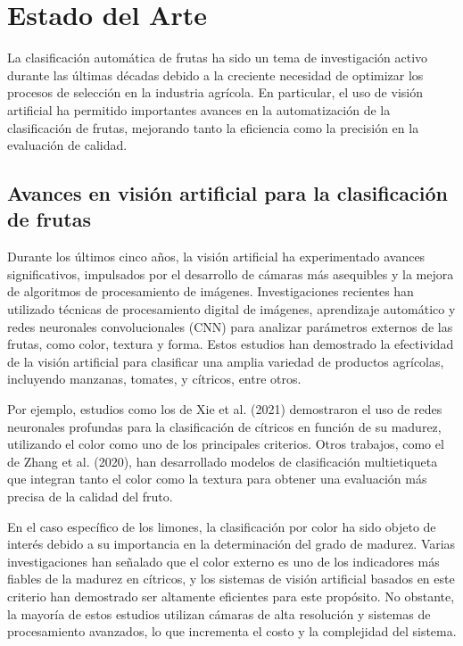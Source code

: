 \section{Estado del Arte}

La clasificación automática de frutas ha sido un tema de investigación activo durante las últimas décadas debido a la creciente necesidad de optimizar los procesos de selección en la industria agrícola. En particular, el uso de visión artificial ha permitido importantes avances en la automatización de la clasificación de frutas, mejorando tanto la eficiencia como la precisión en la evaluación de calidad.

\subsection{Avances en visión artificial para la clasificación de frutas}

Durante los últimos cinco años, la visión artificial ha experimentado avances significativos, impulsados por el desarrollo de cámaras más asequibles y la mejora de algoritmos de procesamiento de imágenes. Investigaciones recientes han utilizado técnicas de procesamiento digital de imágenes, aprendizaje automático y redes neuronales convolucionales (CNN) para analizar parámetros externos de las frutas, como color, textura y forma. Estos estudios han demostrado la efectividad de la visión artificial para clasificar una amplia variedad de productos agrícolas, incluyendo manzanas, tomates, y cítricos, entre otros.

Por ejemplo, estudios como los de Xie et al. (2021) demostraron el uso de redes neuronales profundas para la clasificación de cítricos en función de su madurez, utilizando el color como uno de los principales criterios. Otros trabajos, como el de Zhang et al. (2020), han desarrollado modelos de clasificación multietiqueta que integran tanto el color como la textura para obtener una evaluación más precisa de la calidad del fruto.

En el caso específico de los limones, la clasificación por color ha sido objeto de interés debido a su importancia en la determinación del grado de madurez. Varias investigaciones han señalado que el color externo es uno de los indicadores más fiables de la madurez en cítricos, y los sistemas de visión artificial basados en este criterio han demostrado ser altamente eficientes para este propósito. No obstante, la mayoría de estos estudios utilizan cámaras de alta resolución y sistemas de procesamiento avanzados, lo que incrementa el costo y la complejidad del sistema.

